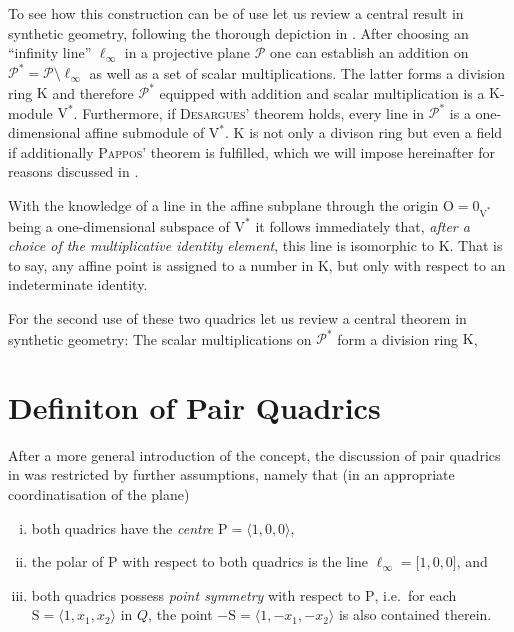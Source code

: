 \documentclass[12pt,english,paper=a4,DIV=12,headings=small,numbers=noenddot,parskip=half]{scrartcl}
\theoremstyle{definition}
\begin{document}
To see how this construction can be of use let us review a central result in synthetic geometry, following the thorough depiction in \cite{Beutelspacher}. After choosing an ``infinity line'' $\ell_\infty$ in a projective plane $\mathscr{P}$ one can establish an addition on $\mathscr{P}^*=\mathscr{P}\setminus\ell_\infty$ as well as a set of scalar multiplications. The latter forms a division ring $\mathrm{K}$ and therefore $\mathscr{P}^*$ equipped with addition and scalar multiplication is a $\mathrm{K}$-module $\mathrm{V}^*$. Furthermore, if \textsc{Desargues}' theorem holds, every line in $\mathscr{P}^*$ is a one-dimensional affine submodule of $\mathrm{V}^*$. $\mathrm{K}$ is not only a divison ring but even a field if additionally \textsc{Pappos}' theorem is fulfilled, which we will impose hereinafter for reasons discussed in \cite{Alex:Th12}.

With the knowledge of a line in the affine subplane through the origin $\mathrm{O}=0_{\mathrm{V}^*}$ being a one-dimensional subspace of $\mathrm{V}^*$ it follows immediately that, \emph{after a choice of the multiplicative identity element}, this line is isomorphic to $\mathrm{K}$. That is to say, any affine point is assigned to a number in $\mathrm{K}$, but only with respect to an indeterminate identity.

For the second use of these two quadrics let us review a central theorem in synthetic geometry: The scalar multiplications on $\mathscr{P}^*$ form a division ring $\mathrm{K}$, 

\section{Definiton of Pair Quadrics}

After a more general introduction of the concept, the discussion of pair quadrics in \cite{Alex:Th12} was restricted by further assumptions, namely that (in an appropriate coordinatisation of the plane)
\begin{enumerate}[i.]
\item{both quadrics have the \emph{centre} $\mathrm{P}=\langle1,0,0\rangle$,}
\item{the polar of $\mathrm{P}$ with respect to both quadrics is the line $\ell_\infty=\lbrack1,0,0\rbrack$, and}
\item{both quadrics possess \emph{point symmetry} with respect to $\mathrm{P}$, i.e.\ for each $\mathrm{S}=\langle1,x_1,x_2\rangle$ in $Q$, the point $\mathrm{-S}=\langle1,-x_1,-x_2\rangle$ is also contained therein.\label{symmetry}}
\end{enumerate}
\end{document}
